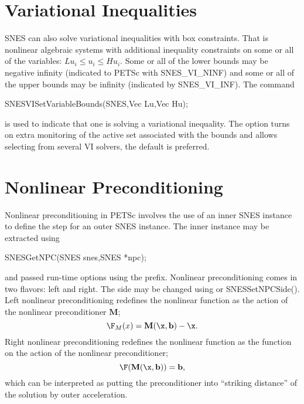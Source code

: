 \section{Variational Inequalities}
\label{sec_vi}

SNES can also solve variational inequalities with box constraints. That is nonlinear algebraic systems with additional inequality constraints on some or all of the variables: $ Lu_i \le u_i \le Hu_i $.
Some or all of the lower bounds may be negative infinity (indicated to PETSc with SNES\_VI\_NINF) and some or all of the upper bounds may be infinity (indicated by SNES\_VI\_INF). The command
\begin{tabbing}
   SNESVISetVariableBounds(SNES,Vec Lu,Vec Hu);
\end{tabbing}
is  used to indicate that one is solving a variational inequality. The option   turns on extra monitoring of the active set associated with the bounds and   allows selecting from several VI solvers, the default is preferred.

\section{Nonlinear Preconditioning}

Nonlinear preconditioning in PETSc involves the use of an inner SNES instance to define the step for an outer SNES
instance.  The inner instance may be extracted using
\begin{tabbing}
SNESGetNPC(SNES snes,SNES *npc);
\end{tabbing}
and passed run-time options using the 
prefix. Nonlinear preconditioning comes in two flavors: left and right.  The side may be changed
using  or SNESSetNPCSide(). Left nonlinear preconditioning redefines the nonlinear function as the action of the
nonlinear preconditioner $\mathbf{M}$;
\begin{equation}
        \F_{M}(x) = \mathbf{M}(\x,\mathbf{b}) - \x.
\end{equation}
\noindent Right nonlinear preconditioning redefines the nonlinear function as the function on the action of the
nonlinear preconditioner;
\begin{equation}
        \F(\mathbf{M}(\x,\mathbf{b})) = \mathbf{b},
\end{equation}
\noindent  which can be interpreted as putting the preconditioner into ``striking distance'' of the solution by outer acceleration.

